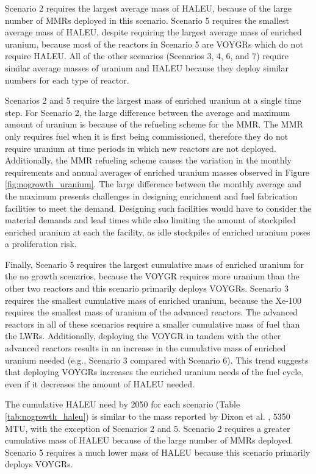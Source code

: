 Scenario 2 requires the largest average mass of \gls{HALEU}, because 
of the large number of \glspl{MMR} deployed in this scenario. Scenario 
5 requires the smallest average mass of \gls{HALEU}, despite requiring the 
largest average mass of enriched uranium, because most of the 
reactors in Scenario 5 are VOYGRs which do not require \gls{HALEU}. 
All of the other scenarios (Scenarios 3, 4, 6, and 7) require similar 
average masses of uranium and \gls{HALEU} because they deploy similar 
numbers for each type of reactor. 

Scenarios 2 and 5 require the largest mass of enriched uranium at a single 
time step. For Scenario 2, the large difference between the average and 
maximum amount of uranium is because of the refueling scheme for the 
\gls{MMR}. The \gls{MMR} only requires fuel when it is first being 
commissioned, therefore they do not require uranium at time periods in 
which
new reactors are not deployed. Additionally, the \gls{MMR} refueling scheme 
causes the variation in the monthly requirements and annual averages of 
enriched uranium masses observed in Figure \ref{fig:nogrowth_uranium}. 
The large difference between the 
monthly average and the maximum presents challenges in designing enrichment 
and fuel fabrication facilities 
to meet the demand. Designing such facilities would have to consider the 
material demands and lead times while also limiting the amount of stockpiled enriched 
uranium at each the facility, as idle stockpiles of enriched uranium 
poses a proliferation risk. 

Finally, Scenario 5 requires the largest cumulative mass of enriched uranium 
for the no growth scenarios, because the VOYGR requires more uranium than 
the other two reactors and this scenario primarily deploys VOYGRs. Scenario 3 
requires the smallest cumulative 
mass of enriched uranium, because the Xe-100 requires the smallest mass of 
uranium of the advanced reactors. The advanced reactors 
in all of these scenarios require a smaller cumulative mass of fuel than 
the \glspl{LWR}. Additionally, deploying the VOYGR in tandem with the other 
advanced reactors results in an increase in the cumulative mass 
of enriched uranium needed (e.g., Scenario 3 compared with Scenario 6). This
trend suggests that deploying VOYGRs increases the enriched uranium needs 
of the fuel cycle, even if it decreases the amount of \gls{HALEU} needed. 

The cumulative \gls{HALEU} need by 2050 for each scenario (Table 
\ref{tab:nogrowth_haleu}) is similar to the mass reported by 
Dixon et al. \cite{dixon_estimated_2022}, 5350 MTU, with the exception 
of Scenarios 2 and 5. Scenario 2 requires a greater cumulative mass of 
\gls{HALEU} because of the large number of \glspl{MMR} deployed. Scenario 
5 requires a much lower mass of \gls{HALEU} because this scenario primarily 
deploys VOYGRs. 

